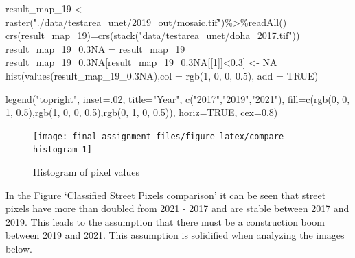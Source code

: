 \documentclass[
]{article}
\newenvironment{Shaded}{\begin{snugshade}}{\end{snugshade}}
\newcommand{\AttributeTok}[1]{\textcolor[rgb]{0.77,0.63,0.00}{#1}}
\newcommand{\ConstantTok}[1]{\textcolor[rgb]{0.00,0.00,0.00}{#1}}
\newcommand{\DecValTok}[1]{\textcolor[rgb]{0.00,0.00,0.81}{#1}}
\newcommand{\FloatTok}[1]{\textcolor[rgb]{0.00,0.00,0.81}{#1}}
\newcommand{\FunctionTok}[1]{\textcolor[rgb]{0.00,0.00,0.00}{#1}}
\newcommand{\NormalTok}[1]{#1}
\newcommand{\OtherTok}[1]{\textcolor[rgb]{0.56,0.35,0.01}{#1}}
\newcommand{\SpecialCharTok}[1]{\textcolor[rgb]{0.00,0.00,0.00}{#1}}
\newcommand{\StringTok}[1]{\textcolor[rgb]{0.31,0.60,0.02}{#1}}
\begin{document}
\begin{Shaded}
\begin{Highlighting}[]
\NormalTok{result\_map\_19 }\OtherTok{\textless{}{-}} \FunctionTok{raster}\NormalTok{(}\StringTok{"./data/testarea\_unet/2019\_out/mosaic.tif"}\NormalTok{)}\SpecialCharTok{\%\textgreater{}\%}\FunctionTok{readAll}\NormalTok{()}
\FunctionTok{crs}\NormalTok{(result\_map\_19)}\OtherTok{=}\FunctionTok{crs}\NormalTok{(}\FunctionTok{stack}\NormalTok{(}\StringTok{"data/testarea\_unet/doha\_2017.tif"}\NormalTok{))}
\NormalTok{result\_map\_19\_0}\FloatTok{.3}\NormalTok{NA }\OtherTok{=}\NormalTok{ result\_map\_19}
\NormalTok{result\_map\_19\_0}\FloatTok{.3}\NormalTok{NA[result\_map\_19\_0}\FloatTok{.3}\NormalTok{NA[[}\DecValTok{1}\NormalTok{]]}\SpecialCharTok{\textless{}}\FloatTok{0.3}\NormalTok{] }\OtherTok{\textless{}{-}} \ConstantTok{NA}
\FunctionTok{hist}\NormalTok{(}\FunctionTok{values}\NormalTok{(result\_map\_19\_0}\FloatTok{.3}\NormalTok{NA),}\AttributeTok{col =} \FunctionTok{rgb}\NormalTok{(}\DecValTok{1}\NormalTok{, }\DecValTok{0}\NormalTok{, }\DecValTok{0}\NormalTok{, }\FloatTok{0.5}\NormalTok{), }\AttributeTok{add =} \ConstantTok{TRUE}\NormalTok{)}

\FunctionTok{legend}\NormalTok{(}\StringTok{"topright"}\NormalTok{, }\AttributeTok{inset=}\NormalTok{.}\DecValTok{02}\NormalTok{, }\AttributeTok{title=}\StringTok{"Year"}\NormalTok{,}
   \FunctionTok{c}\NormalTok{(}\StringTok{"2017"}\NormalTok{,}\StringTok{"2019"}\NormalTok{,}\StringTok{"2021"}\NormalTok{), }\AttributeTok{fill=}\FunctionTok{c}\NormalTok{(}\FunctionTok{rgb}\NormalTok{(}\DecValTok{0}\NormalTok{, }\DecValTok{0}\NormalTok{, }\DecValTok{1}\NormalTok{, }\FloatTok{0.5}\NormalTok{),}\FunctionTok{rgb}\NormalTok{(}\DecValTok{1}\NormalTok{, }\DecValTok{0}\NormalTok{, }\DecValTok{0}\NormalTok{, }\FloatTok{0.5}\NormalTok{),}\FunctionTok{rgb}\NormalTok{(}\DecValTok{0}\NormalTok{, }\DecValTok{1}\NormalTok{, }\DecValTok{0}\NormalTok{, }\FloatTok{0.5}\NormalTok{)), }
   \AttributeTok{horiz=}\ConstantTok{TRUE}\NormalTok{, }\AttributeTok{cex=}\FloatTok{0.8}\NormalTok{)}
\end{Highlighting}
\end{Shaded}

\begin{figure}

{\centering \texttt{[image: final\_assignment\_files/figure-latex/compare histogram-1]} 

}

\caption{Histogram of pixel values}\label{fig:compare histogram}
\end{figure}

In the Figure `Classified Street Pixels comparison' it can be seen that
street pixels have more than doubled from 2021 - 2017 and are stable
between 2017 and 2019. This leads to the assumption that there must be a
construction boom between 2019 and 2021. This assumption is solidified
when analyzing the images below.
\end{document}
